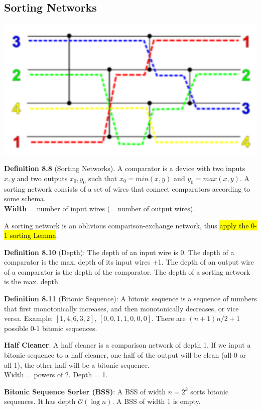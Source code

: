 \documentclass[a4paper, 8pt, landscape]{scrartcl}
\begin{document}
\begin{multicols*}{3}
\subsection{Sorting Networks}

\begin{minipage}{\columnwidth}
	\centering
	\includegraphics[width=0.45\columnwidth]{source/sortingnetwork}
	\vspace*{-2mm}
\end{minipage}%

\textbf{Definition 8.8} (Sorting Networks). A comparator is a device with two inputs $x, y$ and two outputs $x_0, y_0$ such that $x_0 = min(x, y)$ and $y_0 = max(x, y)$. A sorting network consists of a set of wires that connect comparators according to some schema.\\
\textbf{Width} = number of input wires (= number of output wires).

A sorting network is an oblivious comparison-exchange network, thus \hl{apply the 0-1 sorting Lemma}.

\textbf{Definition 8.10} (Depth): The depth of an input wire is 0. The depth of a comparator is the max. depth of its input wires +1. The depth of an output wire of a comparator is the depth of the comparator. The depth of a sorting network is the max. depth. 

\textbf{Definition 8.11} (Bitonic Sequence): A bitonic sequence is a sequence of numbers that first monotonically increases, and then monotonically decreases, or vice versa. Example: $[1,4,6,3,2]$, $[0,0,1,1,0,0,0]$. There are $(n+1)n/2 + 1$ possible 0-1 bitonic sequences.


\textbf{Half Cleaner}: A half cleaner is a comparison network of depth 1. If we input a bitonic sequence to a half cleaner, one half of the output will be clean (all-0 or all-1), the other half will be a bitonic sequence.\\
Width = powers of 2. Depth = 1.

\textbf{Bitonic Sequence Sorter (BSS)}: A BSS of width $n = 2^k$ sorts bitonic sequences. It has depth $\mathcal{O}(\log n)$. A BSS of width 1 is empty.


\end{multicols*}
\end{document}
